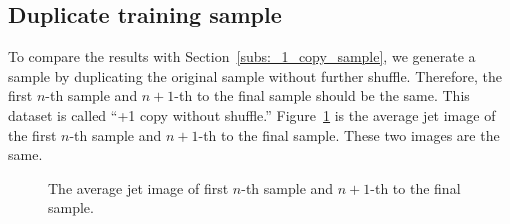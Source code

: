 \documentclass[12pt]{article}
\begin{document}
	\subsection{Duplicate training sample}%
	\label{sub:duplicate_training_sample}
		To compare the results with Section~\ref{subs:_1_copy_sample}, we generate a sample by duplicating the original sample without further shuffle. Therefore, the first $n$-th sample and $n+1$-th to the final sample should be the same. This dataset is called ``+1 copy without shuffle.'' Figure~\ref{fig:average_jet_image_0_to_n_n_to_2n} is the average jet image of the first $n$-th sample and $n+1$-th to the final sample. These two images are the same. 
		\begin{figure}[htpb]
			\centering
			\caption{The average jet image of first $n$-th sample and $n+1$-th to the final sample.}
			\label{fig:average_jet_image_0_to_n_n_to_2n}
		\end{figure}
\end{document}
